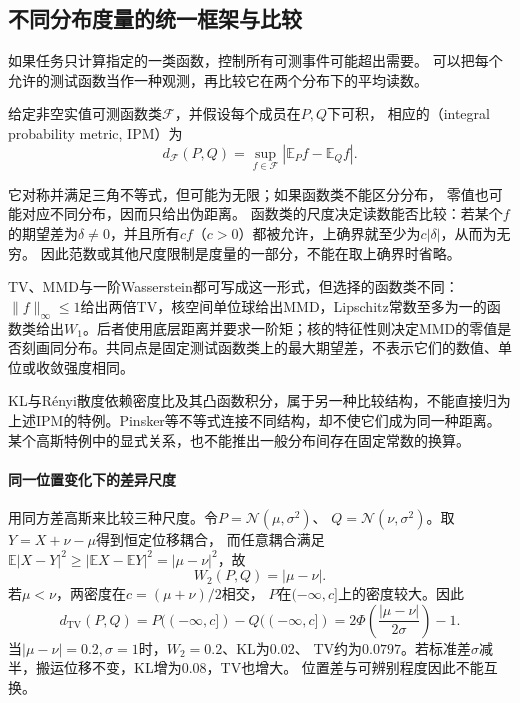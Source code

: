\subsection{不同分布度量的统一框架与比较}
\label{sec:information-metric-comparison}

如果任务只计算指定的一类函数，控制所有可测事件可能超出需要。
可以把每个允许的测试函数当作一种观测，再比较它在两个分布下的平均读数。

\begin{definition}[积分概率度量]
\label{def:information-ipm}
给定非空实值可测函数类\(\mathcal F\)，并假设每个成员在\(P,Q\)下可积，
相应的（integral probability metric, IPM）为
\begin{equation}
  d_{\mathcal F}(P,Q)=\sup_{f\in\mathcal F}
           |\mathbb E_Pf-\mathbb E_Qf|.
  \label{eq:information-ipm}
\end{equation}
\end{definition}
它对称并满足三角不等式，但可能为无限；如果函数类不能区分分布，
零值也可能对应不同分布，因而只给出伪距离。
函数类的尺度决定读数能否比较：若某个\(f\)的期望差为\(\delta\neq0\)，并且所有\(cf\)（\(c>0\)）都被允许，上确界就至少为\(c|\delta|\)，从而为无穷。
因此范数或其他尺度限制是度量的一部分，不能在取上确界时省略。

TV、MMD与一阶Wasserstein都可写成这一形式，但选择的函数类不同：\(\|f\|_\infty\leq1\)给出两倍TV，核空间单位球给出MMD，Lipschitz常数至多为一的函数类给出\(W_1\)。后者使用底层距离并要求一阶矩；核的特征性则决定MMD的零值是否刻画同分布。共同点是固定测试函数类上的最大期望差，不表示它们的数值、单位或收敛强度相同。

KL与R\'enyi散度依赖密度比及其凸函数积分，属于另一种比较结构，不能直接归为上述IPM的特例。Pinsker等不等式连接不同结构，却不使它们成为同一种距离。某个高斯特例中的显式关系，也不能推出一般分布间存在固定常数的换算。

\paragraph{同一位置变化下的差异尺度}
用同方差高斯来比较三种尺度。令\(P=\mathcal N(\mu,\sigma^2)\)、
\(Q=\mathcal N(\nu,\sigma^2)\)。取\(Y=X+\nu-\mu\)得到恒定位移耦合，
而任意耦合满足
\(\mathbb E|X-Y|^2\geq|\mathbb EX-\mathbb EY|^2=|\mu-\nu|^2\)，故
\begin{equation}
  W_2(P,Q)=|\mu-\nu|.
  \label{eq:information-gaussian-location-wasserstein}
\end{equation}
若\(\mu<\nu\)，两密度在\(c=(\mu+\nu)/2\)相交，
\(P\)在\((-\infty,c]\)上的密度较大。因此
\[
  d_{\mathrm{TV}}(P,Q)
  =P((-\infty,c])-Q((-\infty,c])
  =2\Phi\left(\frac{|\mu-\nu|}{2\sigma}\right)-1.
\]
当\(|\mu-\nu|=0.2,\sigma=1\)时，\(W_2=0.2\)、KL为\(0.02\)、
TV约为\(0.0797\)。若标准差\(\sigma\)减半，搬运位移不变，KL增为\(0.08\)，TV也增大。
位置差与可辨别程度因此不能互换。


